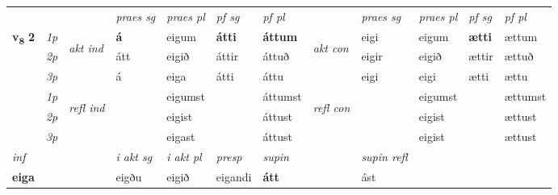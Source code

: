 \begin{longtable}[l]{X>{\footnotesize\itshape}llXXXXlXXXX}
 & &   & \textit{praes sg}  & \textit{praes pl}    & \textit{ pf sg} & \textit{pf pl} & & \textit{praes sg}  & \textit{praes pl}    & \textit{pf sg} & \textit{pf pl }  \\ \cmidrule{4-7} \cmidrule{9-12}
 \multirow{2}{*}{{{\textbf{v{\textsubscript{8}}} \Large{\textbf{2}}}}}  & 1p & \multirow{3}{*}{\begin{turn}{90}\textit{akt ind}\end{turn}} & \textbf{á} & eigum & \textbf{átti} & \textbf{áttum} & \multirow{3}{*}{\begin{turn}{90}\textit{akt con}\end{turn}} &eigi & eigum & \textbf{ætti} & ættum\\*
 & 2p &  &  átt  & eigið & áttir & áttuð & & eigir & eigið & ættir & ættuð \\*
 & 3p &  & á & eiga & átti & áttu & & eigi & eigi& ætti & ættu \\*
\cmidrule{4-7} \cmidrule{9-12}
 & 1p & \multirow{3}{*}{\begin{turn}{90}\textit{refl ind}\end{turn}}  &  & eigumst &  & áttumst & \multirow{3}{*}{\begin{turn}{90}\textit{refl con}\end{turn}}  & & eigumst &  & ættumst \\*
 & 2p &  &  & eigist &  & áttust & & & eigist &  & ættust \\*
 & 3p  & &  & eigast &  & áttust & &  & eigist&  & ættust \\*
\cmidrule{4-7} \cmidrule{9-12}

   {\textit{inf}} & &  & \textit{i akt sg} & \textit{i akt pl}   & \textit{presp} & \textit{supin} && \textit{supin refl}  \\*
  {\textbf{eiga}} & && eigðu  & eigið   & eigandi &  \textbf{átt} && ást  \\*

\midrule


\end{longtable}
